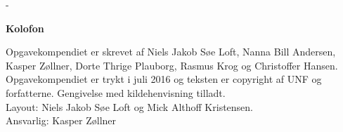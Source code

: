 \newpage


\begin{adjustwidth*}{\frontpagecorrection}{-\frontpagecorrection}
  \thispagestyle{empty}
  \strut
  \setlength{\parindent}{0pt}
  \addtolength{\parskip}{.6em}

  \vfill
    
  \begin{center}
    \bfseries Kolofon
  \end{center}
 
  \makeatletter
  \edef\fontandleading{\@memptsize.0/\the\baselineskip}
  \makeatother

  \small
   
  \textsl{\thesistitle}
    
  \smallskip
  
  Opgavekompendiet er skrevet af Niels Jakob Søe Loft, Nanna Bill
  Andersen, Kasper Zøllner, Dorte Thrige Plauborg, Rasmus Krog og Christoffer Hansen. 
  Opgavekompendiet er trykt i juli 2016 og teksten er copyright
   af UNF og forfatterne. Gengivelse med kildehenvisning tilladt. \\
  Layout: Niels Jakob Søe Loft og Mick Althoff Kristensen.\\
  Ansvarlig: Kasper Zøllner
\end{adjustwidth*}



